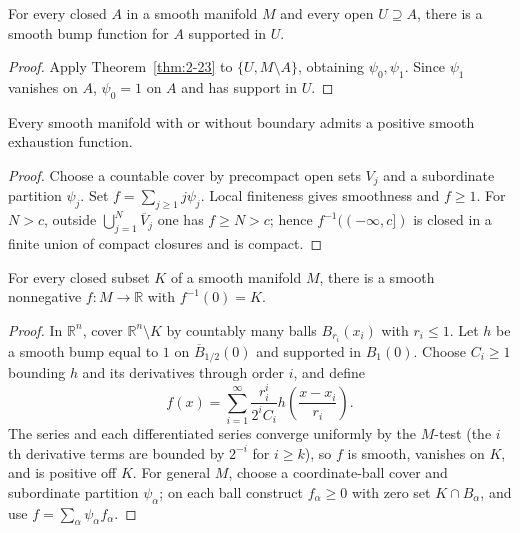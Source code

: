 \begin{proposition}
\label{prop:2-25}





For every closed $A$ in a smooth manifold $M$ and every open $U\supseteq A$, there is a smooth bump function for $A$ supported in $U$.
\end{proposition}

\begin{proof}

\sketch Apply Theorem~\ref{thm:2-23} to $\{U,M\setminus A\}$, obtaining $\psi_0,\psi_1$. Since $\psi_1$ vanishes on $A$, $\psi_0=1$ on $A$ and has support in $U$.
\end{proof}

\begin{proposition}
\label{prop:2-28}




Every smooth manifold with or without boundary admits a positive smooth exhaustion function.
\end{proposition}

\begin{proof}

\sketch Choose a countable cover by precompact open sets $V_j$ and a subordinate partition $\psi_j$. Set $f=\sum_{j\geq1}j\psi_j$. Local finiteness gives smoothness and $f\geq1$. For $N>c$, outside $\bigcup_{j=1}^N\overline V_j$ one has $f\geq N>c$; hence $f^{-1}(( -\infty,c])$ is closed in a finite union of compact closures and is compact.
\end{proof}

\begin{theorem}
\label{thm:2-29}




For every closed subset $K$ of a smooth manifold $M$, there is a smooth nonnegative $f:M\to\mathbb R$ with $f^{-1}(0)=K$.
\end{theorem}

\begin{proof}

\sketch In $\mathbb R^n$, cover $\mathbb R^n\setminus K$ by countably many balls $B_{r_i}(x_i)$ with $r_i\leq1$. Let $h$ be a smooth bump equal to $1$ on $\overline B_{1/2}(0)$ and supported in $B_1(0)$. Choose $C_i\geq1$ bounding $h$ and its derivatives through order $i$, and define
\[
f(x)=\sum_{i=1}^\infty\frac{r_i^i}{2^iC_i}h\!\left(\frac{x-x_i}{r_i}\right).
\]
The series and each differentiated series converge uniformly by the $M$-test (the $i$th derivative terms are bounded by $2^{-i}$ for $i\geq k$), so $f$ is smooth, vanishes on $K$, and is positive off $K$. For general $M$, choose a coordinate-ball cover and subordinate partition $\psi_\alpha$; on each ball construct $f_\alpha\geq0$ with zero set $K\cap B_\alpha$, and use $f=\sum_\alpha\psi_\alpha f_\alpha$.
\end{proof}

